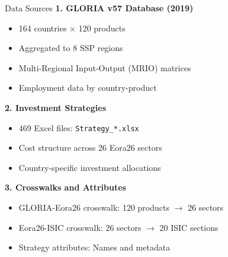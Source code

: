 \documentclass[10pt]{beamer}
\begin{document}
\begin{frame}{Data Sources}
\textbf{1. GLORIA v57 Database (2019)}
\begin{itemize}
    \item 164 countries $\times$ 120 products
    \item Aggregated to 8 SSP regions
    \item Multi-Regional Input-Output (MRIO) matrices
    \item Employment data by country-product
\end{itemize}

\vspace{0.3cm}

\textbf{2. Investment Strategies}
\begin{itemize}
    \item 469 Excel files: \texttt{Strategy\_*.xlsx}
    \item Cost structure across 26 Eora26 sectors
    \item Country-specific investment allocations
\end{itemize}

\vspace{0.3cm}

\textbf{3. Crosswalks and Attributes}
\begin{itemize}
    \item GLORIA-Eora26 crosswalk: 120 products $\rightarrow$ 26 sectors
    \item Eora26-ISIC crosswalk: 26 sectors $\rightarrow$ 20 ISIC sections
    \item Strategy attributes: Names and metadata
\end{itemize}
\end{frame}

\end{document}
